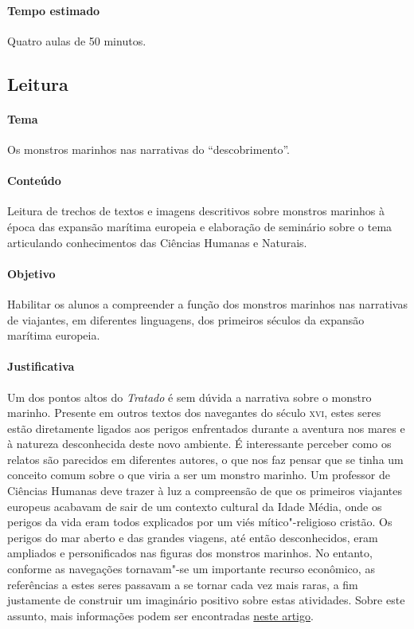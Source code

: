 \documentclass[12pt]{extarticle}
\begin{document}
{\paragraph{Tempo estimado} Quatro aulas de 50 minutos.


\subsection{Leitura}

\paragraph{Tema} Os monstros marinhos nas narrativas do ``descobrimento''.

\paragraph{Conteúdo} Leitura de trechos de textos e imagens descritivos
sobre monstros marinhos à época das expansão marítima europeia e 
elaboração de seminário sobre o tema articulando conhecimentos das 
Ciências Humanas e Naturais.  

\paragraph{Objetivo} Habilitar os alunos a compreender a função dos 
monstros marinhos nas narrativas de viajantes, em diferentes linguagens, 
dos primeiros séculos da expansão marítima europeia.

\paragraph{Justificativa} Um dos pontos altos do \emph{Tratado} é sem
dúvida a narrativa sobre o monstro marinho. Presente em outros textos 
dos navegantes do século \textsc{xvi}, estes seres estão diretamente
ligados aos perigos enfrentados durante a aventura nos mares e à natureza
desconhecida deste novo ambiente. É interessante perceber como os relatos
são parecidos em diferentes autores, o que nos faz pensar que se tinha 
um conceito comum sobre o que viria a ser um monstro marinho. 
Um professor de Ciências Humanas deve trazer à luz a compreensão de que
os primeiros viajantes europeus acabavam de sair de um contexto cultural
da Idade Média, onde os perigos da vida eram todos explicados por um
viés mítico"-religioso cristão. Os perigos do mar aberto e das grandes 
viagens, até então desconhecidos, eram ampliados e personificados nas
figuras dos monstros marinhos. No entanto, conforme as navegações 
tornavam"-se um importante recurso econômico, as referências a estes seres
passavam a se tornar cada vez mais raras, a fim justamente de construir
um imaginário positivo sobre estas atividades. 
Sobre este assunto, mais informações podem ser encontradas \href{https://www2.ufjf.br/noticias/2015/12/16/monstros-na-historia-relatos-de-viagens-expedicionarias-e-brasil-colonia/}{neste artigo}.

}
\end{document}
